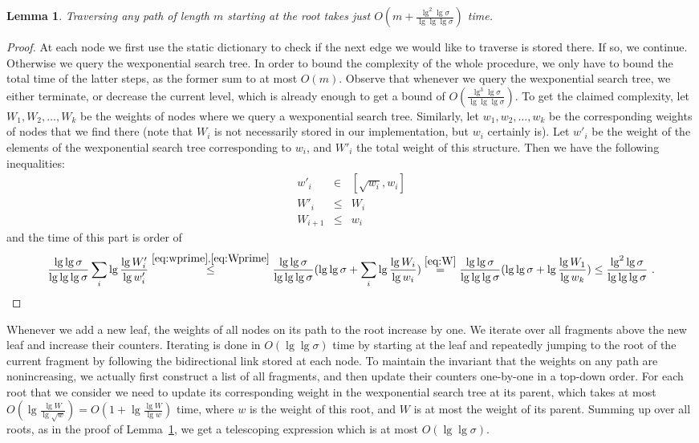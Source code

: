 \documentclass[11pt,onecolumn,final]{article} \usepackage{a4}
\theoremstyle{plain}
\newtheorem{lemma}[definition]{Lemma}
\theoremstyle{remark}
\begin{document}
\begin{lemma}
\label{thm:search}
Traversing any path of length $m$ starting at the root takes just $O(m+\frac{\lg^{2}\lg\sigma}{\lg\lg\lg\sigma})$ time.
\end{lemma}

\begin{proof}
At each node we first use the static dictionary to check if the next edge we would like to traverse is stored there. If so, we continue. Otherwise we query the wexponential search tree. In order to bound the complexity of the whole procedure, we only have to bound the total time of the latter steps, as the former sum to at most $O(m)$. Observe that whenever we query the wexponential search tree, we either terminate, or decrease the current level, which is already enough to get a bound of $O(\frac{\lg^{3}\lg\sigma}{\lg\lg\lg\sigma})$. To get the claimed complexity, let $W_{1},W_{2},\ldots,W_{k}$ be the weights of nodes where we query a wexponential search tree. Similarly, let $w_{1},w_{2},\ldots,w_{k}$ be the corresponding weights of nodes that we find there (note that $W_{i}$ is not necessarily stored in our implementation, but $w_{i}$ certainly is). Let $w'_{i}$ be the weight of the elements of the wexponential search tree corresponding to $w_{i}$, and $W'_{i}$ the total weight of this structure. Then we have the following inequalities:
\begin{eqnarray}
w'_{i}  &\in& [\sqrt{w_{i}},w_{i}] \label{eq:wprime}\\
W'_{i} &\leq& W_{i} \label{eq:Wprime}\\
W_{i+1} &\leq& w_{i}\label{eq:W}
\end{eqnarray}
and the time of this part is order of
$$
\frac{\lg\lg\sigma}{\lg\lg\lg\sigma}\sum_{i} \lg\frac{\lg W'_{i}}{\lg w'_{i}}
\stackrel{\eqref{eq:wprime},\eqref{eq:Wprime}}{\le} \frac{\lg\lg\sigma}{\lg\lg\lg\sigma}(\lg\lg\sigma+\sum_{i}\lg\frac{\lg{W_{i}}}{\lg w_{i}})
\stackrel{\eqref{eq:W}}{=} \frac{\lg\lg\sigma}{\lg\lg\lg\sigma}(\lg\lg\sigma+\lg\frac{\lg{W_1}}{\lg w_k})
\le \frac{\lg^{2}\lg\sigma}{\lg\lg\lg\sigma}\ .
$$
\end{proof}

Whenever we add a new leaf, the weights of all nodes on its path to the root increase by one. We iterate over all fragments above the new leaf and increase their counters. Iterating is done in $O(\lg\lg\sigma)$ time by starting at the leaf and repeatedly jumping to the root of the current fragment by following the bidirectional link stored at each node. To maintain the invariant that the weights on any path are nonincreasing, we actually first construct a list of all fragments, and then update their counters one-by-one in a top-down order. For each root that we consider we need to update its corresponding weight in the wexponential search tree at its parent, which takes at most $O(\lg\frac{\lg W}{\lg \sqrt{w}})=O(1+\lg\frac{\lg W}{\lg w})$ time, where $w$ is the weight of this root, and $W$ is at most the weight of its parent. Summing up over all roots, as in the proof of Lemma~\ref{thm:search}, we get a telescoping expression which is at most $O(\lg\lg\sigma)$.
\end{document}
